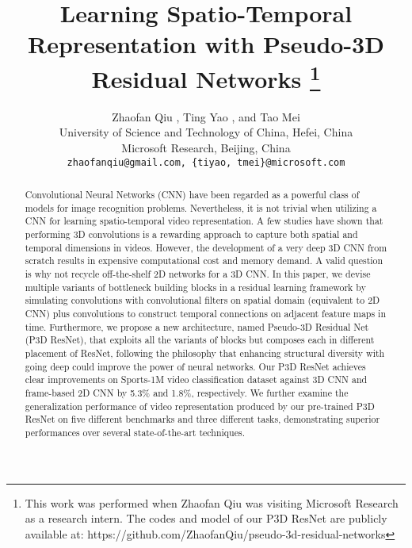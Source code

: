 \documentclass[10pt,twocolumn,letterpaper]{article}
\begin{document}
\title{Learning Spatio-Temporal Representation with Pseudo-3D Residual Networks
\thanks{{\small This work was performed when Zhaofan Qiu was visiting Microsoft Research as a research intern. The codes and model of our P3D ResNet are publicly available at: https://github.com/ZhaofanQiu/pseudo-3d-residual-networks}}}
\author{Zhaofan Qiu , Ting Yao , and Tao Mei \\
 University of Science and Technology of China, Hefei, China\\
 Microsoft Research, Beijing, China\\
{\tt\small zhaofanqiu@gmail.com, \{tiyao, tmei\}@microsoft.com}
}

\maketitle
\thispagestyle{empty}

\begin{abstract}
Convolutional Neural Networks (CNN) have been regarded as a powerful class of models for image recognition problems. Nevertheless, it is not trivial when utilizing a CNN for learning spatio-temporal video representation. A few studies have shown that performing 3D convolutions is a rewarding approach to capture both spatial and temporal dimensions in videos. However, the development of a very deep 3D CNN from scratch results in expensive computational cost and memory demand. A valid question is why not recycle off-the-shelf 2D networks for a 3D CNN. In this paper, we devise multiple variants of bottleneck building blocks in a residual learning framework by simulating  convolutions with  convolutional filters on spatial domain (equivalent to 2D CNN) plus  convolutions to construct temporal connections on adjacent feature maps in time. Furthermore, we propose a new architecture, named Pseudo-3D Residual Net (P3D ResNet), that exploits all the variants of blocks but composes each in different placement of ResNet, following the philosophy that enhancing structural diversity with going deep could improve the power of neural networks. Our P3D ResNet achieves clear improvements on Sports-1M video classification dataset against 3D CNN and frame-based 2D CNN by 5.3\% and 1.8\%, respectively. We further examine the generalization performance of video representation produced by our pre-trained P3D ResNet on five different benchmarks and three different tasks, demonstrating superior performances over several state-of-the-art techniques.
\end{abstract}
\end{document}
